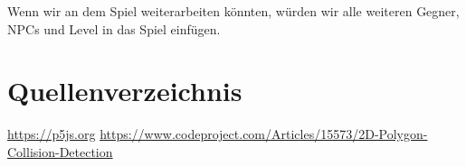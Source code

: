 \documentclass[12pt]{report}
\begin{document}
    Wenn wir an dem Spiel weiterarbeiten könnten, würden wir alle weiteren
    Gegner, NPCs und Level in das Spiel einfügen.

    \chapter{Quellenverzeichnis}
    \url{https://p5js.org}
    \url{https://www.codeproject.com/Articles/15573/2D-Polygon-Collision-Detection}
    
\end{document}
